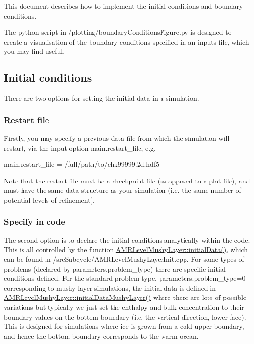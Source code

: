 This document describes how to implement the initial conditions and boundary conditions.

The python script in {\ttfamily /plotting/boundary\+Conditions\+Figure.py} is designed to create a visualisation of the boundary conditions specified in an inputs file, which you may find useful.

\subsection*{Initial conditions}

There are two options for setting the initial data in a simulation.

\subsubsection*{Restart file}

Firstly, you may specify a previous data file from which the simulation will restart, via the input option {\ttfamily main.\+restart\+\_\+file}, e.\+g.


\begin{DoxyCode}
main.restart\_file = /full/path/to/chk99999.2d.hdf5
\end{DoxyCode}


Note that the restart file must be a checkpoint file (as opposed to a plot file), and must have the same data structure as your simulation (i.\+e. the same number of potential levels of refinement).

\subsubsection*{Specify in code}

The second option is to declare the initial conditions analytically within the code. This is all controlled by the function {\ttfamily \hyperlink{class_a_m_r_level_mushy_layer_adae77fea47630fd1e3c2dea1c59e4c3a}{A\+M\+R\+Level\+Mushy\+Layer\+::initial\+Data()}}, which can be found in {\ttfamily /src\+Subcycle/\+A\+M\+R\+Level\+Mushy\+Layer\+Init.cpp}. For some types of problems (declared by {\ttfamily parameters.\+problem\+\_\+type}) there are specific initial conditions defined. For the standard problem type, {\ttfamily parameters.\+problem\+\_\+type=0} corresponding to mushy layer simulations, the initial data is defined in {\ttfamily \hyperlink{class_a_m_r_level_mushy_layer_a601849adc5f5b5fc9e9999b568020922}{A\+M\+R\+Level\+Mushy\+Layer\+::initial\+Data\+Mushy\+Layer()}} where there are lots of possible variations but typically we just set the enthalpy and bulk concentration to their boundary values on the bottom boundary (i.\+e. the vertical direction, lower face). This is designed for simulations where ice is grown from a cold upper boundary, and hence the bottom boundary corresponds to the warm ocean.

